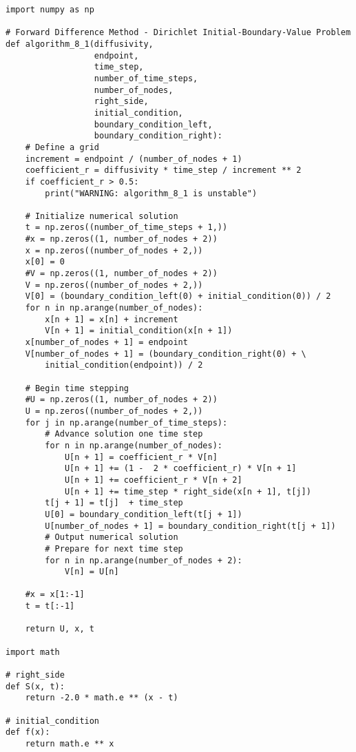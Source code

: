\documentclass{amsbook}%
\theoremstyle{plain}
\numberwithin{equation}{section}
\begin{document}
\begin{small}
\begin{verbatim}
import numpy as np

# Forward Difference Method - Dirichlet Initial-Boundary-Value Problem
def algorithm_8_1(diffusivity,
                  endpoint,
                  time_step,
                  number_of_time_steps,
                  number_of_nodes,
                  right_side,
                  initial_condition,
                  boundary_condition_left,
                  boundary_condition_right):
    # Define a grid
    increment = endpoint / (number_of_nodes + 1)
    coefficient_r = diffusivity * time_step / increment ** 2
    if coefficient_r > 0.5:
        print("WARNING: algorithm_8_1 is unstable")
        
    # Initialize numerical solution
    t = np.zeros((number_of_time_steps + 1,))
    #x = np.zeros((1, number_of_nodes + 2))
    x = np.zeros((number_of_nodes + 2,))
    x[0] = 0
    #V = np.zeros((1, number_of_nodes + 2))
    V = np.zeros((number_of_nodes + 2,))
    V[0] = (boundary_condition_left(0) + initial_condition(0)) / 2
    for n in np.arange(number_of_nodes):
        x[n + 1] = x[n] + increment
        V[n + 1] = initial_condition(x[n + 1])
    x[number_of_nodes + 1] = endpoint
    V[number_of_nodes + 1] = (boundary_condition_right(0) + \
    	initial_condition(endpoint)) / 2

    # Begin time stepping
    #U = np.zeros((1, number_of_nodes + 2))
    U = np.zeros((number_of_nodes + 2,))    
    for j in np.arange(number_of_time_steps):
        # Advance solution one time step
        for n in np.arange(number_of_nodes):
            U[n + 1] = coefficient_r * V[n]
            U[n + 1] += (1 -  2 * coefficient_r) * V[n + 1]
            U[n + 1] += coefficient_r * V[n + 2]
            U[n + 1] += time_step * right_side(x[n + 1], t[j])
        t[j + 1] = t[j]  + time_step
        U[0] = boundary_condition_left(t[j + 1])
        U[number_of_nodes + 1] = boundary_condition_right(t[j + 1])        
        # Output numerical solution
        # Prepare for next time step
        for n in np.arange(number_of_nodes + 2):
            V[n] = U[n]
            
    #x = x[1:-1]
    t = t[:-1]
            
    return U, x, t

import math

# right_side
def S(x, t):
    return -2.0 * math.e ** (x - t)

# initial_condition
def f(x):
    return math.e ** x


\end{verbatim}
\end{small}
\end{document}
